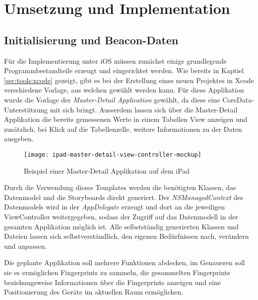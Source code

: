 \chapter{Umsetzung und Implementation}
\label{chap:implementation}


\section{Initialisierung und Beacon-Daten}
\label{sec:implementation:initandbeacon}


Für die Implementierung unter iOS müssen zunächst einige grundlegende Programmbestandteile erzeugt und eingerichtet werden.
Wie bereits in Kaptiel \ref{sec:tools:xcode} gezeigt, gibt es bei der Erstellung eines neuen Projektes in Xcode verschiedene Vorlage, aus welchen gewählt werden kann. Für diese Applikation wurde die Vorlage der \emph{Master-Detail Application} gewählt, da diese eine CoreData-Unterstützung mit sich bringt. Ausserdem lassen sich über die Master-Detail Applikation die bereits gemessenen Werte in einem Tabellen View anzeigen und zusätzlich, bei Klick auf die Tabellenzelle, weitere Informationen zu der Daten ausgeben.

\begin{figure}[htb!]
		\centering
	\texttt{[image: ipad-master-detail-view-controller-mockup]}
	\caption{Beispiel einer Master-Detail Applikation auf dem iPad}
	\label{master-detail-view-controller}
\end{figure}

Durch die Verwendung dieses Templates werden die benötigten Klassen, das Datenmodel und die Storyboards direkt generiert. Der \emph{NSManagedContext} des Datenmodels wird in der \emph{AppDelegate} erzeugt und dort an die jeweiligen ViewController weitergegeben, sodass der Zugriff auf das Datenmodell in der gesamten Applikation möglich ist. Alle selbstständig generierten Klassen und Dateien lassen sich selbstverständlich, den eigenen Bedürfnissen nach, verändern und anpassen.

Die geplante Applikation soll mehrere Funktionen abdecken, im Genaueren soll sie es ermöglichen Fingerprints zu sammeln, die gesammelten Fingerprints beziehungsweise Informationen über die Fingerprints anzeigen und eine Positionierung des Geräte im aktuellen Raum ermöglichen.

